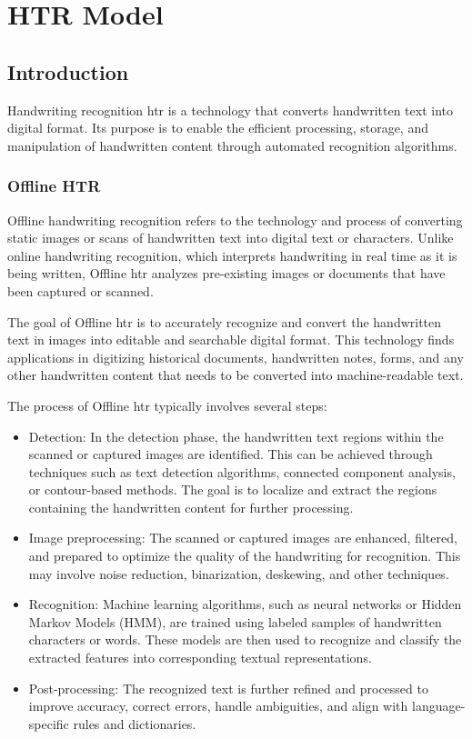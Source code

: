 
\chapter{HTR Model} 
\label{ch:Chapter5}
\vfill \minitoc \newpage

\section{Introduction}
Handwriting recognition \gls{htr} is a technology that converts handwritten text into digital format. Its purpose is to enable the efficient processing, storage, and manipulation of handwritten content through automated recognition algorithms.

\subsection{Offline HTR}
Offline handwriting recognition refers to the technology and process of converting static images or scans of handwritten text into digital text or characters. Unlike online handwriting recognition, which interprets handwriting in real time as it is being written, Offline \gls{htr} analyzes pre-existing images or documents that have been captured or scanned.

The goal of Offline \gls{htr} is to accurately recognize and convert the handwritten text in images into editable and searchable digital format. This technology finds applications in digitizing historical documents, handwritten notes, forms, and any other handwritten content that needs to be converted into machine-readable text.

The process of Offline \gls{htr} typically involves several steps:
\begin{itemize}
    \item Detection: In the detection phase, the handwritten text regions within the scanned or captured images are identified. This can be achieved through techniques such as text detection algorithms, connected component analysis, or contour-based methods. The goal is to localize and extract the regions containing the handwritten content for further processing.

    \item Image preprocessing: The scanned or captured images are enhanced, filtered, and prepared to optimize the quality of the handwriting for recognition. This may involve noise reduction, binarization, deskewing, and other techniques.
    
    \item Recognition: Machine learning algorithms, such as neural networks or Hidden Markov Models (HMM), are trained using labeled samples of handwritten characters or words. These models are then used to recognize and classify the extracted features into corresponding textual representations.

    \item Post-processing: The recognized text is further refined and processed to improve accuracy, correct errors, handle ambiguities, and align with language-specific rules and dictionaries.

\end{itemize}


